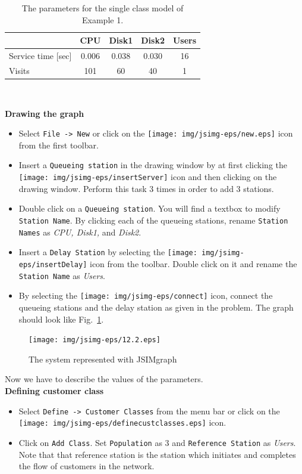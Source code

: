 \begin{table}
\begin{center}
  \begin{tabular}{|l|c|c|c|c|}
\hline
     &CPU  &Disk1  &Disk2&Users  \\ \hline
    Service time [sec] &0.006  &0.038  &0.030&16  \\ \hline
    Visits &101  &60  &40&1  \\ \hline
      \end{tabular}\\
\end{center}
 \caption{The parameters for the single class model of Example 1.}
 \label{fig:ex1par}
\end{table}

\noindent \textbf{Drawing the graph}
\begin{itemize}
\item  Select \texttt{File -> New} or click on the
\texttt{[image: img/jsimg-eps/new.eps]} icon from
the first toolbar. \item Insert a \texttt{Queueing station} in the
drawing window by at first clicking the
\texttt{[image: img/jsimg-eps/insertServer]} icon and then clicking
on the drawing window. Perform this task 3 times in order to add 3
stations. \item Double click on a \texttt{Queueing station}. You
will find a textbox to modify \texttt{Station Name}. By clicking
each of the queueing stations, rename \texttt{Station Names} as
\emph{CPU, Disk1,} and \emph{Disk2}. \item Insert a \texttt{Delay
Station} by selecting the
\texttt{[image: img/jsimg-eps/insertDelay]} icon from
the toolbar. Double click on it and rename the \texttt{Station
Name} as \emph{Users}. \item By selecting the
\texttt{[image: img/jsimg-eps/connect]} icon, connect
the queueing stations and the delay station as given in the
problem. The graph should look like Fig.~\ref{fig:ex1repr}.
\end{itemize}
\begin{figure}[htb]
    \begin{center}
        \texttt{[image: img/jsimg-eps/12.2.eps]}
    \end{center}
    \caption{The system represented with JSIMgraph}
    \label{fig:ex1repr}
\end{figure}
Now we have to describe the values of the parameters.\\

\noindent \textbf{Defining customer class} \begin{itemize} \item
Select \texttt{Define -> Customer Classes} from the menu bar or
click on the
\texttt{[image: img/jsimg-eps/definecustclasses.eps]}
icon. \item Click on \texttt{Add Class}. Set \texttt{Population}
as 3 and \texttt{Reference Station} as \emph{Users}. Note that
that reference station is the station which initiates and
completes the flow of customers in the network.
\end{itemize}

